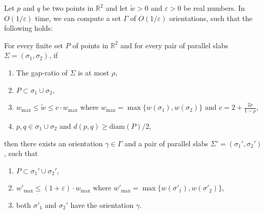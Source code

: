 \documentclass[english,a4paper, cleveref, autoref, thm-restate, nolineno]{socg-lipics-v2021}
\theoremstyle{star}
\theoremstyle{claimstar}
\newcommand{\eps}{\ensuremath{\varepsilon}}
\newcommand{\diam}{\ensuremath{\mathrm{diam}}}
\begin{document}




\begin{lemma}
    \label{lem:parallel_angles}
    Let $p$ and $q$ be two points in $\mathbb R^2$ and let $\widetilde w > 0$ and $\eps> 0$ be real numbers.
    In $O(1/\eps)$ time, we can compute a set $\Gamma$ of $O(1/\eps)$ orientations, such that the following holds:
    
    For every finite set $P$ of points in $\mathbb R^2$ and for every pair of parallel slabs $\Sigma= (\sigma_1, \sigma_2)$, if 
    \begin{enumerate}[(1)]
        \item The gap-ratio of $\Sigma$ is at most $\rho$, 
        \item $P\subset \sigma_1 \cup \sigma_2$, 
        \item $w_{\max} \le \widetilde w \le c\cdot w_{\max}$ where $w_{\max} = \max \{w(\sigma_1), w(\sigma_2) \}$ and $c = 2 + \frac{2\rho}{1-\rho}$,
        \item $p, q \in \sigma_1 \cup \sigma_2$ and $d(p,q) \ge \diam(P)/2$,
    \end{enumerate}
    then there exists an orientation $\gamma \in \Gamma$ and  a pair of parallel slabs $\Sigma' = (\sigma_1', \sigma_2')$, such that
    \begin{enumerate}[(1)]
        \item $P \subset \sigma_1' \cup \sigma_2'$,
        \item $w'_{\max} \le (1+ \eps) \cdot w_{\max}$ where $w'_{\max} = \max \{w(\sigma'_1), w(\sigma'_2) \}$,
        \item both $\sigma'_1$ and $\sigma_2'$ have the orientation $\gamma$.
    \end{enumerate}
\end{lemma}
\end{document}
